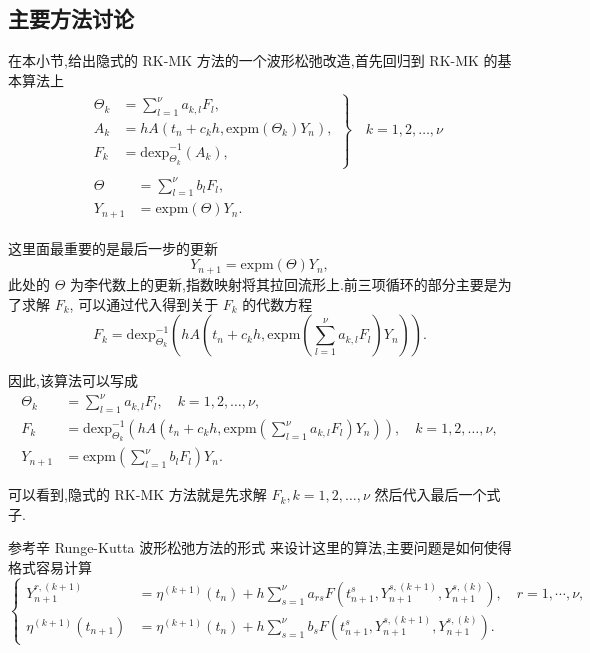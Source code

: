 \subsection{主要方法讨论}

在本小节,给出隐式的 RK-MK 方法的一个波形松弛改造,首先回归到 RK-MK 的基本算法上
\begin{equation*}
	\begin{aligned}
		&\left.\begin{aligned}
		\Theta_k&=\sum_{l=1}^{\nu}a_{k,l}F_l,\\
		A_k&=hA(t_n+c_kh,\mbox{expm}(\Theta_k)Y_n),\\
		F_k&=\mbox{dexp}_{\Theta_k}^{-1}(A_k),
	\end{aligned}\right\rbrace \quad k=1,2,\ldots,\nu\\
		&\begin{aligned}
		\Theta&=\sum_{l=1}^{\nu}b_lF_l,\\
		Y_{n+1}&=\mbox{expm}(\Theta)Y_n.
	\end{aligned}
	\end{aligned}
\end{equation*}

这里面最重要的是最后一步的更新
\begin{equation*}
	Y_{n+1}=\mbox{expm}(\Theta)Y_n,
\end{equation*}
此处的 $\Theta$ 为李代数上的更新,指数映射将其拉回流形上.前三项循环的部分主要是为了求解 $F_k$, 可以通过代入得到关于 $F_k$ 的代数方程
\begin{equation*}
	F_k=\mbox{dexp}_{\Theta_k}^{-1}(hA(t_n+c_kh,\mbox{expm}(\sum_{l=1}^{\nu}a_{k,l}F_l)Y_n)).
\end{equation*}

因此,该算法可以写成
\begin{equation*}
	\begin{aligned}
		\Theta_k&=\sum_{l=1}^{\nu}a_{k,l}F_l,\quad k=1,2,\ldots,\nu,\\
		F_k&=\mbox{dexp}_{\Theta_k}^{-1}(hA(t_n+c_kh,\mbox{expm}(\sum_{l=1}^{\nu}a_{k,l}F_l)Y_n)),\quad k=1,2,\ldots,\nu,\\
		Y_{n+1}&=\mbox{expm}(\sum_{l=1}^{\nu}b_lF_l)Y_n.
	\end{aligned}
\end{equation*}

可以看到,隐式的 RK-MK 方法就是先求解 $F_k,k=1,2,\ldots,\nu$ 然后代入最后一个式子.

参考辛 Runge-Kutta 波形松弛方法的形式 \cite{bellen1993use} 来设计这里的算法,主要问题是如何使得格式容易计算
\begin{equation*}
  \left\lbrace
    \begin{aligned}
      Y_{n+1}^{r,(k+1)}&=\eta^{(k+1)}(t_{n})+h\sum_{s=1}^{\nu}a_{rs}F(t_{n+1}^{s},Y_{n+1}^{s,(k+1)},Y_{n+1}^{s,(k)}),\quad r=1,\cdots, \nu, \\
      \eta^{(k+1)}(t_{n+1})&=\eta^{(k+1)}(t_{n})+h\sum_{s=1}^{\nu}b_{s}F(t_{n+1}^{s},Y_{n+1}^{s,(k+1)},Y_{n+1}^{s,(k)}).
    \end{aligned}
  \right.
\end{equation*}

